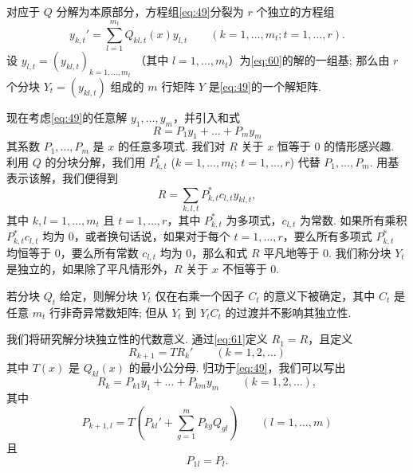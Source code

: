 对应于 $Q$ 分解为本原部分，方程组\eqref{eq:49}分裂为 $r$ 个独立的方程组
\begin{equation}
y_{k,t}' = \sum_{l=1}^{m_t} Q_{kl,t}(x)y_{l,t} \qquad (k=1,\dots,m_t; t=1,\dots,r). \tag{60}\label{eq:60}
\end{equation}
设 $y_{l,t} = (y_{kl,t})_{k=1,\dots,m_t}$ （其中 $l=1,\dots,m_t$）为\eqref{eq:60}的解的一组基; 那么由 $r$ 个分块 $Y_t=(y_{kl,t})$ 组成的 $m$ 行矩阵 $Y$ 是\eqref{eq:49}的一个解矩阵.

现在考虑\eqref{eq:49}的任意解 $y_1, \dots, y_m$，并引入和式
\begin{equation}
R = P_1 y_1 + \dots + P_m y_m \tag{61}\label{eq:61}
\end{equation}
其系数 $P_1, \dots, P_m$ 是 $x$ 的任意多项式. 我们对 $R$ 关于 $x$ 恒等于 0 的情形感兴趣. 利用 $Q$ 的分块分解，我们用 $P_{k,t}^*$ ($k=1,\dots,m_t$; $t=1,\dots,r$) 代替 $P_1, \dots, P_m$. 用基表示该解，我们便得到
\begin{equation}
R = \sum_{k,l,t} P_{k,t}^* c_{l,t} y_{kl,t}, \tag{62}\label{eq:62}
\end{equation}
其中 $k,l=1,\dots,m_t$ 且 $t=1,\dots,r$，其中 $P_{k,t}^*$ 为多项式，$c_{l,t}$ 为常数. 如果所有乘积 $P_{k,t}^* c_{l,t}$ 均为 0，或者换句话说，如果对于每个 $t=1,\dots,r$，要么所有多项式 $P_{k,t}^*$ 均恒等于 0，要么所有常数 $c_{l,t}$ 均为 0，那么和式 $R$ 平凡地等于 0. 我们称分块 $Y_t$ 是独立的，如果除了平凡情形外，$R$ 关于 $x$ 不恒等于 0.

若分块 $Q_t$ 给定，则解分块 $Y_t$ 仅在右乘一个因子 $C_t$ 的意义下被确定，其中 $C_t$ 是任意 $m_t$ 行非奇异常数矩阵; 但从 $Y_t$ 到 $Y_t C_t$ 的过渡并不影响其独立性.

我们将研究解分块独立性的代数意义. 通过\eqref{eq:61}定义 $R_1 = R$，且定义
\begin{equation}
R_{k+1} = T R_k' \qquad (k=1,2,\dots) \tag{63}\label{eq:63}
\end{equation}
其中 $T(x)$ 是 $Q_{kl}(x)$ 的最小公分母. 归功于\eqref{eq:49}，我们可以写出
\begin{equation}
R_{k} = P_{k1}y_{1} + \dots + P_{km}y_{m} \qquad (k=1,2,\dots), \tag{64}\label{eq:64}
\end{equation}
其中
\begin{equation}
P_{k+1,l} = T \left( P_{kl}' + \sum_{g=1}^{m} P_{kg}Q_{gl} \right) \qquad (l=1,\dots,m) \tag{65}\label{eq:65}
\end{equation}
且
\begin{equation}
P_{1l} = P_l. \tag{66}\label{eq:66}
\end{equation}

